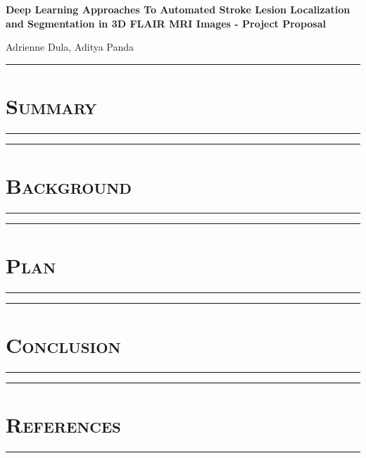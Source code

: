 \documentclass[10pt]{article} %
\begin{document}
\begin{center}
{\bf Deep Learning Approaches To Automated Stroke Lesion Localization and Segmentation in 3D FLAIR MRI Images - Project Proposal} %
\end{center}

\begin{center}
Adrienne Dula, Aditya Panda
\end{center}

\begin{center}
    \par\noindent\rule{\textwidth}{0.2pt}
    \section*{\textsc{\textmd{Summary}}}
    \par\noindent\rule{\textwidth}{0.2pt}
\end{center}


\begin{center}
    \par\noindent\rule{\textwidth}{0.2pt}
    \section*{\textsc{\textmd{Background}}}
    \par\noindent\rule{\textwidth}{0.2pt}
\end{center}


\begin{center}
    \par\noindent\rule{\textwidth}{0.2pt}
    \section*{\textsc{\textmd{Plan}}}
    \par\noindent\rule{\textwidth}{0.2pt}
\end{center}


\begin{center}
    \par\noindent\rule{\textwidth}{0.2pt}
    \section*{\textsc{\textmd{Conclusion}}}
    \par\noindent\rule{\textwidth}{0.2pt}
\end{center}


\begin{center}
    \par\noindent\rule{\textwidth}{0.2pt}
    \section*{\textsc{\textmd{References}}}
    \par\noindent\rule{\textwidth}{0.2pt}
\end{center}

\begingroup
\renewcommand{\section}[2]{}%


\endgroup
\end{document}
